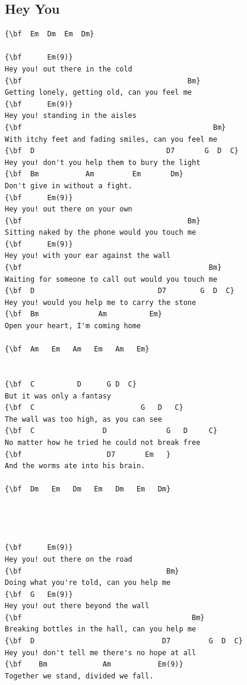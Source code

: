 \documentclass[a4paper]{article}
\begin{document}
\subsection{Hey You}
\begin{Verbatim}[commandchars=\\\{\}]
{\bf  Em  Dm  Em  Dm}

{\bf      Em(9)}
Hey you! out there in the cold
{\bf                                       Bm}
Getting lonely, getting old, can you feel me
{\bf      Em(9)}
Hey you! standing in the aisles
{\bf                                             Bm}
With itchy feet and fading smiles, can you feel me
{\bf  D                               D7       G  D  C}
Hey you! don't you help them to bury the light
{\bf  Bm           Am         Em       Dm}
Don't give in without a fight.
{\bf      Em(9)}
Hey you! out there on your own
{\bf                                       Bm}
Sitting naked by the phone would you touch me
{\bf      Em(9)}
Hey you! with your ear against the wall
{\bf                                            Bm}
Waiting for someone to call out would you touch me
{\bf  D                             D7        G  D  C}
Hey you! would you help me to carry the stone
{\bf  Bm              Am          Em}
Open your heart, I'm coming home

{\bf  Am   Em   Am   Em   Am   Em}


{\bf  C          D      G D  C}
But it was only a fantasy
{\bf  C                         G   D   C}
The wall was too high, as you can see
{\bf  C                D              G   D     C}
No matter how he tried he could not break free
{\bf                    D7       Em   }
And the worms ate into his brain.

{\bf  Dm   Em   Dm   Em   Dm   Em   Dm}




{\bf      Em(9)}
Hey you! out there on the road
{\bf                                  Bm}
Doing what you're told, can you help me
{\bf  G   Em(9)}
Hey you! out there beyond the wall
{\bf                                        Bm}
Breaking bottles in the hall, can you help me
{\bf  D                              D7         G  D  C}
Hey you! don't tell me there's no hope at all
{\bf    Bm             Am           Em(9)}
Together we stand, divided we fall.

\end{Verbatim}
\newpage
\end{document}
